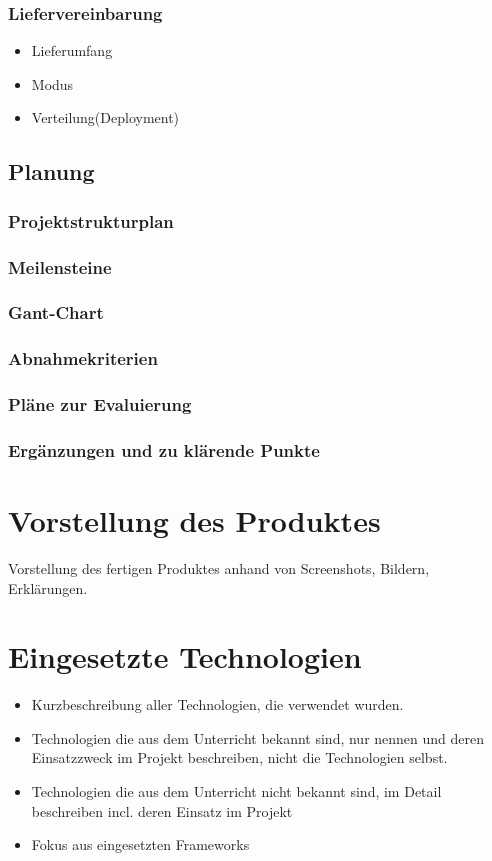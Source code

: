 \subsection{Liefervereinbarung}
\begin{itemize}
	\item Lieferumfang
	\item Modus
	\item Verteilung(Deployment)
\end{itemize}
\section{Planung}
\subsection{Projektstrukturplan}
\subsection{Meilensteine}
\subsection{Gant-Chart}
\subsection{Abnahmekriterien}
\subsection{Pläne zur Evaluierung}
\subsection{Ergänzungen und zu klärende Punkte}

\chapter{Vorstellung des Produktes}
Vorstellung des fertigen Produktes anhand von Screenshots, Bildern, Erklärungen.

\chapter{Eingesetzte Technologien}
\begin{itemize}
	\item Kurzbeschreibung aller Technologien, die verwendet wurden.
	\item Technologien die aus dem Unterricht bekannt sind, nur nennen und deren  Einsatzzweck im Projekt beschreiben, nicht die Technologien selbst.
	\item Technologien die aus dem Unterricht nicht bekannt sind, im Detail beschreiben incl. deren Einsatz im Projekt
	\item Fokus aus eingesetzten Frameworks
\end{itemize}

